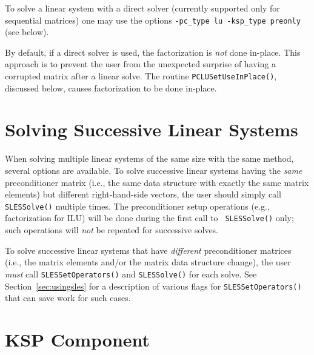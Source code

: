 To solve a linear system with a direct solver (currently supported 
only for sequential matrices) one may use the options
{\tt -pc\_type lu -ksp\_type preonly} (see below).

By default, if a direct solver is used, the factorization is {\em not} done 
in-place. This approach is to prevent the user from the unexpected surprise
of having a corrupted matrix after a linear solve. The routine 
{\tt PCLUSetUseInPlace()}, discussed below, causes factorization to 
be done in-place.  

\section{Solving Successive Linear Systems}

When solving multiple linear systems of the same size with the same
method, several options are available.  To solve successive linear
systems having the {\em same} preconditioner matrix (i.e., the same
data structure with exactly the same matrix elements) but different
right-hand-side vectors, the user should simply call {\tt SLESSolve()}
multiple times.  The preconditioner setup operations (e.g.,
factorization for ILU) will be done during the first call to {\tt
SLESSolve()} only; such operations will {\em not} be repeated for
successive solves.

To solve successive linear systems that have {\em different}
preconditioner matrices (i.e., the matrix elements and/or the matrix
data structure change), the user {\em must} call 
{\tt SLESSetOperators()} and {\tt SLESSolve()} for each solve.  See
Section~\ref{sec:usingsles} for a description of various flags for
{\tt SLESSetOperators()} that can save work for such cases.

\section{KSP Component}
\label{sec:ksp}

